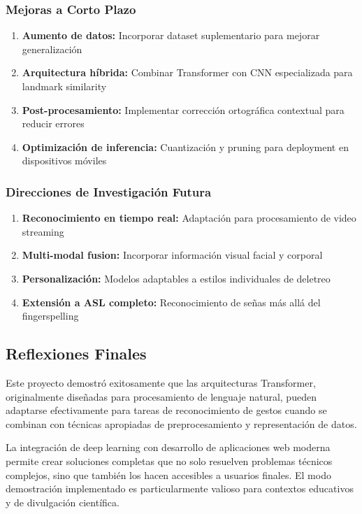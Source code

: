 \documentclass[12pt,a4paper]{article}
\begin{document}
\subsubsection{Mejoras a Corto Plazo}
\begin{enumerate}
    \item \textbf{Aumento de datos:} Incorporar dataset suplementario para mejorar generalización
    \item \textbf{Arquitectura híbrida:} Combinar Transformer con CNN especializada para landmark similarity
    \item \textbf{Post-procesamiento:} Implementar corrección ortográfica contextual para reducir errores
    \item \textbf{Optimización de inferencia:} Cuantización y pruning para deployment en dispositivos móviles
\end{enumerate}

\subsubsection{Direcciones de Investigación Futura}
\begin{enumerate}
    \item \textbf{Reconocimiento en tiempo real:} Adaptación para procesamiento de video streaming
    \item \textbf{Multi-modal fusion:} Incorporar información visual facial y corporal
    \item \textbf{Personalización:} Modelos adaptables a estilos individuales de deletreo
    \item \textbf{Extensión a ASL completo:} Reconocimiento de señas más allá del fingerspelling
\end{enumerate}

\subsection{Reflexiones Finales}

Este proyecto demostró exitosamente que las arquitecturas Transformer, originalmente diseñadas para procesamiento de lenguaje natural, pueden adaptarse efectivamente para tareas de reconocimiento de gestos cuando se combinan con técnicas apropiadas de preprocesamiento y representación de datos.

La integración de deep learning con desarrollo de aplicaciones web moderna permite crear soluciones completas que no solo resuelven problemas técnicos complejos, sino que también los hacen accesibles a usuarios finales. El modo demostración implementado es particularmente valioso para contextos educativos y de divulgación científica.
\end{document}
